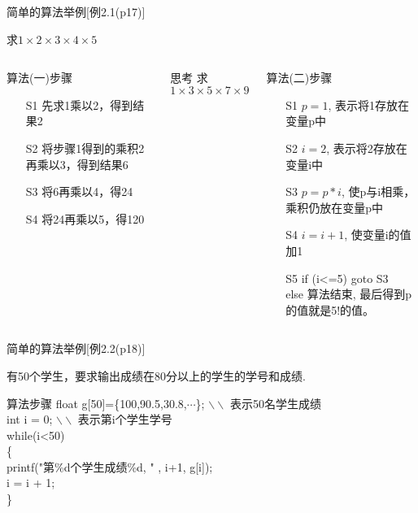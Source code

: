 \begin{frame}[shrink]{简单的算法举例[例2.1(p17)]}
\begin{example}
	[例2.1(p17)] 求$1\times 2\times 3\times 4\times 5$
\end{example}
\small
\begin{columns}
	\begin{block}{算法(一)步骤}
		\begin{enumerate}
			\item[S1] 先求1乘以2，得到结果2
			\item[S2] 将步骤1得到的乘积2再乘以3，得到结果6
			\item[S3] 将6再乘以4，得24
			\item[S4] 将24再乘以5，得120
		\end{enumerate}	
	\end{block}
    \begin{block}{思考}
    	求$1\times 3\times 5\times 7\times 9$
    \end{block}
	\begin{block}{算法(二)步骤}
		\begin{enumerate}
			\item[S1] $p=1$, 表示将1存放在变量p中
			\item[S2] $i=2$, 表示将2存放在变量i中
			\item[S3] $p=p*i$, 使p与i相乘，乘积仍放在变量p中
			\item[S4] $i=i+1$, 使变量i的值加1
			\item[S5] if (i<=5) goto S3\\
			          else 算法结束, 最后得到p的值就是5!的值。
		\end{enumerate}	
	\end{block}
\end{columns}
\end{frame}

\begin{frame}[shrink]{简单的算法举例[例2.2(p18)]}
\begin{example}
	[例2.2(p18)] 有50个学生，要求输出成绩在80分以上的学生的学号和成绩.
\end{example}

\begin{block}{算法步骤}
	float g[50]=\{100,90.5,30.8,$\cdots$\}; $\backslash\backslash$ 表示50名学生成绩\\
	int i = 0;  $\backslash\backslash$ 表示第i个学生学号\\
	while(i<50) \\
	\{ \\
	   \qquad printf("第\%d个学生成绩\%d, " , i+1, g[i]); \\
	   \qquad i = i + 1;\\
	\} 
\end{block}
\end{frame}

